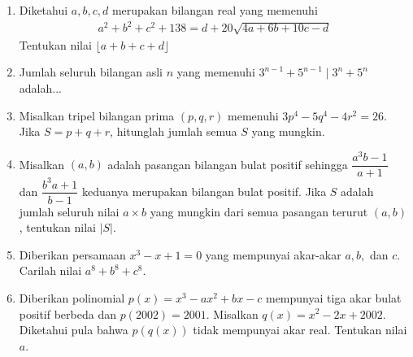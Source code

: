 \documentclass[12pt]{scrartcl}
\begin{document}
\begin{enumerate}
    \item Diketahui $a,b,c,d$ merupakan bilangan real yang memenuhi
    \begin{align*}
        a^2+b^2+c^2+138 = d+20\sqrt{4a+6b+10c-d}
    \end{align*}
    Tentukan nilai $\lfloor a+b+c+d \rfloor$

    \item Jumlah seluruh bilangan asli $n$ yang memenuhi $3^{n-1}+5^{n-1} \mid 3^n + 5^{n}$ adalah...

    \item Misalkan tripel bilangan prima $(p,q,r)$ memenuhi $3p^4-5q^4-4r^2=26$. Jika $S = p+q+r$, hitunglah jumlah semua $S$ yang mungkin.

    \item Misalkan $(a,b)$ adalah pasangan bilangan bulat positif sehingga $\dfrac{a^3b-1}{a+1}$ dan $\dfrac{b^3a+1}{b-1}$ keduanya merupakan bilangan bulat positif. Jika $S$ adalah jumlah seluruh nilai $a \times b$ yang mungkin dari semua pasangan terurut $(a,b)$, tentukan nilai $|S|$.

    \item Diberikan persamaan $x^3-x+1=0$ yang mempunyai akar-akar $a,b,$ dan $c$. Carilah nilai $a^8+b^8+c^8$.

    \item Diberikan polinomial $p(x)=x^3-ax^2+bx-c$ mempunyai tiga akar bulat positif berbeda dan $p(2002)=2001$. Misalkan $q(x)=x^2-2x+2002$. Diketahui pula bahwa $p(q(x))$ tidak mempunyai akar real. Tentukan nilai $a$.
\end{enumerate}
\end{document}
